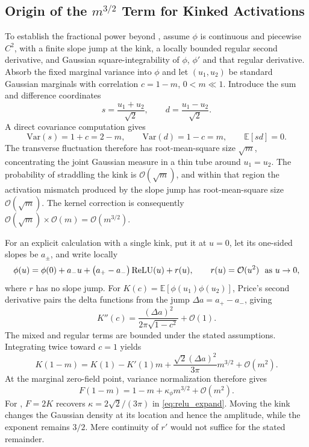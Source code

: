 \subsection{Origin of the $m^{3/2}$ Term for Kinked Activations}
\label{app:tube_argument_kink}

To establish the fractional power beyond \relu{}, assume \(\phi\) is continuous and piecewise \(C^2\), with a finite slope jump at the kink, a locally bounded regular second derivative, and Gaussian square-integrability of \(\phi\), \(\phi'\) and that regular derivative. Absorb the fixed marginal variance into \(\phi\) and let \((u_1,u_2)\) be standard Gaussian marginals with correlation \(c=1-m\), \(0<m\ll1\). Introduce the sum and difference coordinates
\begin{equation}
s=\frac{u_{1}+u_{2}}{\sqrt{2}}, \qquad d=\frac{u_{1}-u_{2}}{\sqrt{2}}.
\end{equation}
A direct covariance computation gives
\begin{equation}
\mathrm{Var}(s)=1+c=2-m, \qquad \mathrm{Var}(d)=1-c=m, \qquad \mathbb{E}[sd]=0.
\end{equation}
The transverse fluctuation therefore has root-mean-square size \(\sqrt m\), concentrating the joint Gaussian measure in a thin tube around \(u_1=u_2\). The probability of straddling the kink is \(\mathcal O(\sqrt m)\), and within that region the activation mismatch produced by the slope jump has root-mean-square size \(\mathcal O(\sqrt m)\). The kernel correction is consequently \(\mathcal O(\sqrt m)\times\mathcal O(m)=\mathcal O(m^{3/2})\).

For an explicit calculation with a single kink, put it at \(u=0\), let its one-sided slopes be \(a_\pm\), and write locally
\begin{equation}
\phi(u)=\phi(0)+a_- u+\big(a_+-a_-\big) \ReLU(u)+r(u), \qquad r(u)=\mathcal O(u^2)\ \ \text{as }u\to 0,
\end{equation}
where \(r\) has no slope jump. For \(K(c)=\mathbb E[\phi(u_1)\phi(u_2)]\), Price's second derivative pairs the delta functions from the jump \(\Delta a=a_+-a_-\), giving
\begin{equation}
K''(c)=\frac{(\Delta a)^2}{2\pi\sqrt{1-c^2}}+\mathcal O(1).
\end{equation}
The mixed and regular terms are bounded under the stated assumptions. Integrating twice toward \(c=1\) yields
\begin{equation}
K(1-m)=K(1)-K'(1)m+\frac{\sqrt2(\Delta a)^2}{3\pi}m^{3/2}+\mathcal O(m^2).
\end{equation}
At the marginal zero-field point, variance normalization therefore gives
\begin{equation}
F(1-m)=1-m+\kappa_\phi m^{3/2}+\mathcal O(m^2).
\end{equation}
For \relu{}, \(F=2K\) recovers \(\kappa=2\sqrt2/(3\pi)\) in \eqref{eq:relu_expand}. Moving the kink changes the Gaussian density at its location and hence the amplitude, while the exponent remains \(3/2\). Mere continuity of \(r'\) would not suffice for the stated remainder.


